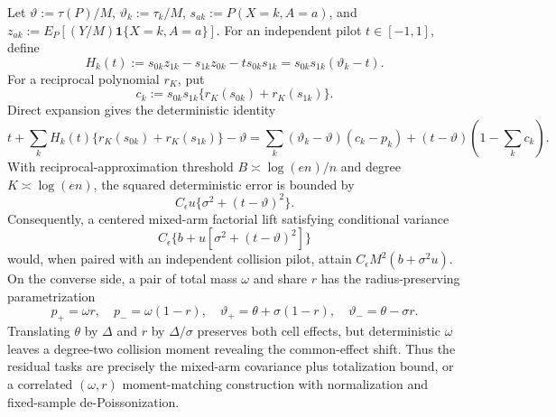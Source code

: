 Let \(\vartheta:=\tau(P)/M\), \(\vartheta_k:=\tau_k/M\), \(s_{ak}:=P(X=k,A=a)\), and \(z_{ak}:=E_P[(Y/M)\mathbf 1\{X=k,A=a\}]\).  For an independent pilot \(t\in[-1,1]\), define
\[
 H_k(t):=s_{0k}z_{1k}-s_{1k}z_{0k}-t s_{0k}s_{1k}
 =s_{0k}s_{1k}(\vartheta_k-t).
\]
For a reciprocal polynomial \(r_K\), put
\[
 c_k:=s_{0k}s_{1k}\{r_K(s_{0k})+r_K(s_{1k})\}.
\]
Direct expansion gives the deterministic identity
\[
 t+\sum_kH_k(t)\{r_K(s_{0k})+r_K(s_{1k})\}-\vartheta
 =\sum_k(\vartheta_k-\vartheta)(c_k-p_k)
 +(t-\vartheta)\left(1-\sum_kc_k\right).
\]
With reciprocal-approximation threshold \(B\asymp\log(en)/n\) and degree \(K\asymp\log(en)\), the squared deterministic error is bounded by
\[
 C_\epsilon u\{\sigma^2+(t-\vartheta)^2\}.
\]
Consequently, a centered mixed-arm factorial lift satisfying conditional variance
\[
 C_\epsilon\{b+u[\sigma^2+(t-\vartheta)^2]\}
\]
would, when paired with an independent collision pilot, attain \(C_\epsilon M^2(b+\sigma^2u)\).  On the converse side, a pair of total mass \(\omega\) and share \(r\) has the radius-preserving parametrization
\[
 p_+=\omega r,\quad p_-=\omega(1-r),\quad
 \vartheta_+=\theta+\sigma(1-r),\quad
 \vartheta_-=\theta-\sigma r.
\]
Translating \(\theta\) by \(\Delta\) and \(r\) by \(\Delta/\sigma\) preserves both cell effects, but deterministic \(\omega\) leaves a degree-two collision moment revealing the common-effect shift.  Thus the residual tasks are precisely the mixed-arm covariance plus totalization bound, or a correlated \((\omega,r)\) moment-matching construction with normalization and fixed-sample de-Poissonization.